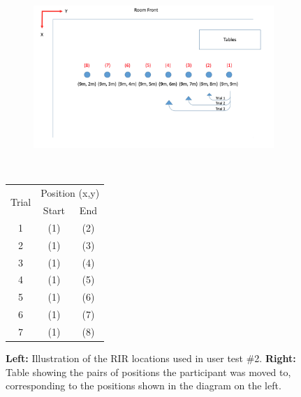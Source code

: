 \documentclass[../../main.tex]{subfiles}
\begin{document}
			\begin{figure}
				\begin{minipage}{0.5\textwidth}
					\begin{figure}[H]
					\hspace{0mm}\includegraphics[scale = 0.3]{Sections/userTesting/images/test2/test2Positions2.png}
					\end{figure}			
				\end{minipage}
				~
				\begin{minipage}{0.5\textwidth}
				    \hspace{35mm}\begin{tabular}{|c|c|c|} \hline
				        \multirow{2}{*}{Trial} & \multicolumn{2}{c|}{Position (x,y)} \\ \cline{2-3}
				             & Start & End \\ \hline
				          1 & (1) & (2) \\
				          2 & (1) & (3) \\
				          3 & (1) & (4) \\
				          4 & (1) & (5) \\
				          5 & (1) & (6) \\
				          6 & (1) & (7) \\
				          7 & (1) & (8) \\ \hline
				    \end{tabular}
			    \end{minipage}
			    \caption{\textbf{Left:} Illustration of the \ac{RIR} locations used in user test \#2. \textbf{Right:} Table showing the pairs of positions the participant was moved to, corresponding to the positions shown in the diagram on the left.}
				\label{test2}
			\end{figure}
\end{document}
